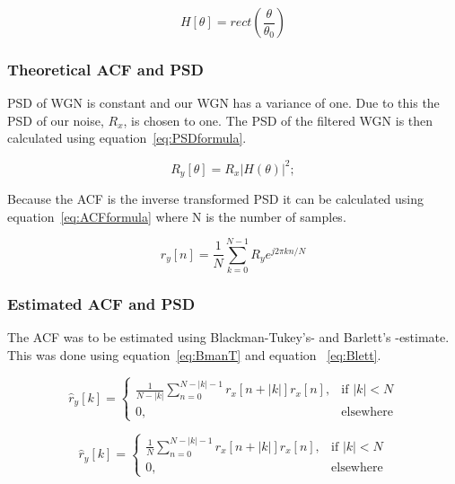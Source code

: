 \documentclass[10pt]{article}
\begin{document}
\begin{equation}
  \label{eq:idealH}
  H[\theta] =rect(\frac{\theta}{\theta_0} )
\end{equation}

\subsubsection{Theoretical ACF and PSD}
PSD of WGN is constant and our WGN has a variance of one. Due to this the PSD of our noise, $R_x$, is chosen to one.
The PSD of the filtered WGN is then calculated using equation~\ref{eq:PSDformula}.

\begin{equation}
  \label{eq:PSDformula}
  R_y[\theta] = R_x|H(\theta)|^2;
\end{equation}

Because the ACF is the inverse transformed PSD it can be calculated using equation~\ref{eq:ACFformula} where N is the number of samples.

\begin{equation}
  \label{eq:ACFformula}
  r_y[n] = \frac{1}{N}\sum_{k=0}^{N-1}R_ye^{j2\pi kn/N}
\end{equation}

\subsubsection{Estimated ACF and PSD}
The ACF was to be estimated using Blackman-Tukey's- and Barlett's -estimate. This was done using equation~\ref{eq:BmanT} and equation ~\ref{eq:Blett}.

\begin{equation}
\label{eq:BmanT}
\hat{r}_y[k] =
\begin{cases}
    \frac{1}{N-|k|}\sum_{n=0}^{N-|k|-1}r_x[n+|k|]r_x[n],& \text{if } |k|< N\\
    0,              & \text{elsewhere}
\end{cases}
\end{equation}


\begin{equation}
\label{eq:Blett}
\hat{r}_y[k] =
\begin{cases}
    \frac{1}{N}\sum_{n=0}^{N-|k|-1}r_x[n+|k|]r_x[n],& \text{if } |k|< N\\
    0,              & \text{elsewhere}
\end{cases}
\end{equation}
\end{document}

